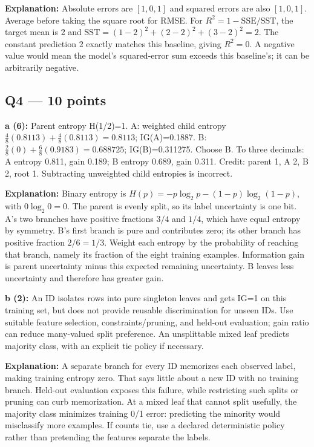 \documentclass[11pt]{article}
\begin{document}
\textbf{Explanation:} Absolute errors are $[1,0,1]$ and squared errors are also $[1,0,1]$. Average before taking the square root for RMSE. For $R^2=1-\mathrm{SSE}/\mathrm{SST}$, the target mean is 2 and $\mathrm{SST}=(1-2)^2+(2-2)^2+(3-2)^2=2$. The constant prediction 2 exactly matches this baseline, giving $R^2=0$. A negative value would mean the model's squared-error sum exceeds this baseline's; it can be arbitrarily negative.


\subsection*{Q4 — 10 points}

\textbf{a (6):} Parent entropy H(1/\allowbreak{}2)=1. A: weighted child entropy $\frac48(0.8113)+\frac48(0.8113)=0.8113$; IG(A)=0.1887. B: $\frac28(0)+\frac68(0.9183)=0.688725$; IG(B)=0.311275. Choose B. To three decimals: A entropy 0.811, gain 0.189; B entropy 0.689, gain 0.311. Credit: parent 1, A 2, B 2, root 1. Subtracting unweighted child entropies is incorrect.

\textbf{Explanation:} Binary entropy is $H(p)=-p\log_2p-(1-p)\log_2(1-p)$, with $0\log_2 0=0$. The parent is evenly split, so its label uncertainty is one bit. A's two branches have positive fractions $3/4$ and $1/4$, which have equal entropy by symmetry. B's first branch is pure and contributes zero; its other branch has positive fraction $2/6=1/3$. Weight each entropy by the probability of reaching that branch, namely its fraction of the eight training examples. Information gain is parent uncertainty minus this expected remaining uncertainty. B leaves less uncertainty and therefore has greater gain.

\textbf{b (2):} An ID isolates rows into pure singleton leaves and gets IG=1 on this training set, but does not provide reusable discrimination for unseen IDs. Use suitable feature selection, constraints/\allowbreak{}pruning, and held-out evaluation; gain ratio can reduce many-valued split preference. An unsplittable mixed leaf predicts majority class, with an explicit tie policy if necessary.

\textbf{Explanation:} A separate branch for every ID memorizes each observed label, making training entropy zero. That says little about a new ID with no training branch. Held-out evaluation exposes this failure, while restricting such splits or pruning can curb memorization. At a mixed leaf that cannot split usefully, the majority class minimizes training 0/\allowbreak{}1 error: predicting the minority would misclassify more examples. If counts tie, use a declared deterministic policy rather than pretending the features separate the labels.
\end{document}
